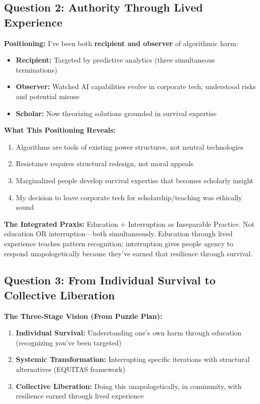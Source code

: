 \documentclass[12pt,letterpaper]{article}
\begin{document}
\subsection*{Question 2: Authority Through Lived Experience}

\textbf{Positioning:} I've been both \textbf{recipient and observer} of algorithmic harm:

\begin{itemize}[leftmargin=*,noitemsep]
    \item \textbf{Recipient:} Targeted by predictive analytics (three simultaneous terminations)
    \item \textbf{Observer:} Watched AI capabilities evolve in corporate tech; understood risks and potential misuse
    \item \textbf{Scholar:} Now theorizing solutions grounded in survival expertise
\end{itemize}

\textbf{What This Positioning Reveals:}
\begin{enumerate}[leftmargin=*,noitemsep]
    \item Algorithms are tools of existing power structures, not neutral technologies
    \item Resistance requires structural redesign, not moral appeals
    \item Marginalized people develop survival expertise that becomes scholarly insight
    \item My decision to leave corporate tech for scholarship/teaching was ethically sound
\end{enumerate}

\begin{criticalinsight}
\textbf{The Integrated Praxis:} Education + Interruption as Inseparable Practice. Not education OR interruption—both simultaneously. Education through lived experience teaches pattern recognition; interruption gives people agency to respond unapologetically because they've earned that resilience through survival.
\end{criticalinsight}

\subsection*{Question 3: From Individual Survival to Collective Liberation}

\textbf{The Three-Stage Vision (From Puzzle Plan):}

\begin{enumerate}[leftmargin=*,noitemsep]
    \item \textbf{Individual Survival:} Understanding one's own harm through education (recognizing you've been targeted)
    \item \textbf{Systemic Transformation:} Interrupting specific iterations with structural alternatives (EQUITAS framework)
    \item \textbf{Collective Liberation:} Doing this unapologetically, in community, with resilience earned through lived experience
\end{enumerate}
\end{document}
